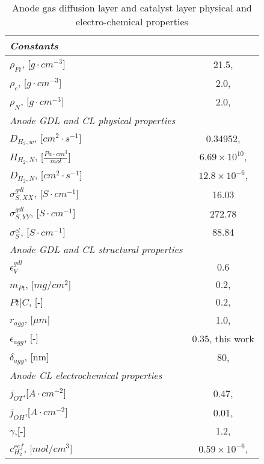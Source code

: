 \documentclass[]{elsart}
\begin{document}
\begin{table}[ptb]\begin{center}
 \caption{Anode gas diffusion layer and catalyst layer physical and electro-chemical properties}
 \label{tb:data_anode}
 \begin{tabular}{lc}  \hline \hline
 	\it{Constants} \\ \hline
	$\rho_{Pt}$, [$g\cdot cm^{-3}$]              & 21.5, \cite{Song04}                            \\
	$\rho_{c}$, [$g\cdot cm^{-3}$]                & 2.0, \cite{Song04}                               \\
	$\rho_{N}$, [$g\cdot cm^{-3}$]               & 2.0, \cite{Song04}                             \\
	\it{Anode GDL and CL physical properties} \\ \hline
	$D_{H_2,w}$,  [$cm^2\cdot s^{-1}$]           &0.34952, \cite{cussler97}                  \\
	$H_{H_2,N}$,  [$\frac{Pa \cdot cm^3}{mol}$]  & $6.69 \times 10^{10}$,  \cite{Karan06}        \\
	 $D_{H_2, N}$, [$cm^2\cdot s^{-1}$]       & $12.8\times10^{-6}$, \cite{Karan06} \\
	$\sigma^{gdl}_{S,XX}$, [$S\cdot cm^{-1}$]     &16.03			                   \\
	$\sigma^{gdl}_{S,YY}$, [$S\cdot cm^{-1}$]     &272.78  \\	
	$\sigma^{cl}_S$, [$S\cdot cm^{-1}$]               & 88.84  \\			                         
	\it{Anode GDL and CL structural properties} \\ \hline
	$\epsilon_V^{gdl}$                                 & 0.6 \\
	$m_{Pt}$, [$mg/cm^2$]                         & 0.2, \cite{Bender03}                            \\
	$Pt|C$, [-]                                              &0.2, \cite{Bender03}          \\
	$r_{agg}$, [$\mu m$]                            &1.0, \cite{Sun05}                             \\
	$\epsilon_{agg}$, [-]                              &0.35, this work             \\
	$\delta_{agg}$, [nm]                              &80, \cite{Sun05}  \\
	\it{Anode CL electrochemical properties} \\ \hline
	$j_{OT}$,[$A\cdot cm^{-2}$]                   &0.47, \cite{Wang06}          \\                
	$j_{OH}$,[$A\cdot cm^{-2}$]                  &0.01, \cite{Wang06}	\\
	$\gamma$,[-]                                          &1.2, \cite{Wang06}             \\
	$c^{ref}_{H_2}$, [$mol/cm^3$]              &$0.59 \times 10^{-6}$, \cite{Karan06,Chen04} \\
	\hline \hline
\end{tabular} \end{center} \end{table}
\end{document}
